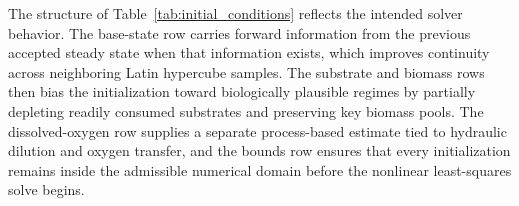 \documentclass[a4paper,fleqn]{cas-sc}
\newenvironment{revblock}{\begingroup\color{revDefault}}{\endgroup}
\newenvironment{revblockr116}{\begingroup\color{revRoneSixteen}}{\endgroup}
\newenvironment{revblockr22}{\begingroup\color{revRtwoTwo}}{\endgroup}
\begin{document}
\begin{revblock}
\begin{revblockr116}
\begin{table}[H]
\centering
\caption{Initialization heuristics used for the steady-state nonlinear solve.}
\label{tab:initial_conditions}
\scriptsize
{}
\end{table}

The structure of Table~\ref{tab:initial_conditions} reflects the intended solver behavior. The base-state row carries forward information from the previous accepted steady state when that information exists, which improves continuity across neighboring Latin hypercube samples. The substrate and biomass rows then bias the initialization toward biologically plausible regimes by partially depleting readily consumed substrates and preserving key biomass pools. The dissolved-oxygen row supplies a separate process-based estimate tied to hydraulic dilution and oxygen transfer, and the bounds row ensures that every initialization remains inside the admissible numerical domain before the nonlinear least-squares solve begins.
\end{revblockr116}

\begin{revblockr22}

\end{revblockr22}
\end{revblock}
\end{document}
